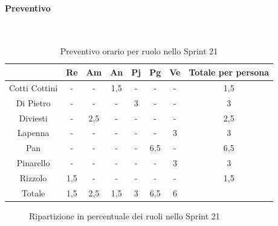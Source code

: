 \documentclass{article}
\begin{document}
            \paragraph{Preventivo}\mbox{}\\
            \begin{table}[H]
                \centering
                \begin{tabular}{|c|c|c|c|c|c|c|c|}
                \hline
                              & Re  & Am  & An  & Pj  & Pg  & Ve  & Totale per persona \\ \hline
                Cotti Cottini & -   & -   & 1,5 & -   & -   & -   & 1,5                \\ \hline
                Di Pietro     & -   & -   & -   & 3   & -   & -   & 3                  \\ \hline
                Diviesti      & -   & 2,5 & -   & -   & -   & -   & 2,5                \\ \hline
                Lapenna       & -   & -   & -   & -   & -   & 3   & 3                  \\ \hline
                Pan           & -   & -   & -   & -   & 6,5 & -   & 6,5                \\ \hline
                Pinarello     & -   & -   & -   & -   & -   & 3   & 3                  \\ \hline
                Rizzolo       & 1,5 & -   & -   & -   & -   & -   & 1,5                \\ \hline
                Totale        & 1,5 & 2,5 & 1,5 & 3   & 6,5 & 6   &                    \\ \hline
                \end{tabular}
                \caption{Preventivo orario per ruolo nello Sprint 21}
            \end{table}


            \begin{figure}[H]
                \centering
                \caption{Ripartizione in percentuale dei ruoli nello Sprint 21}
            \end{figure}


\end{document}
